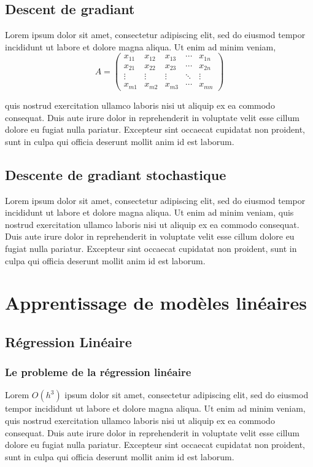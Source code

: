 	
	
	\subsection{Descent de gradiant}
		Lorem ipsum dolor sit amet, consectetur adipiscing elit, sed do eiusmod tempor incididunt ut labore et dolore magna aliqua. Ut enim ad minim veniam, \\ 
		
		$$A = \begin{pmatrix}
		x_{11} & x_{12} & x_{13} & \cdots & x_{1n} \\
		x_{21} & x_{22} & x_{23} & \cdots & x_{2n} \\
		\vdots & \vdots & \vdots & \ddots & \vdots \\
		x_{m1} & x_{m2} & x_{m3} & \cdots & x_{mn} 
		\end{pmatrix}$$
	
	
		quis nostrud exercitation ullamco laboris nisi ut aliquip ex ea commodo consequat. Duis aute irure dolor in reprehenderit in voluptate velit esse cillum dolore eu fugiat nulla pariatur. Excepteur sint occaecat cupidatat non proident, sunt in culpa qui officia deserunt mollit anim id est laborum.
	
	\subsection{Descente de gradiant stochastique}
		Lorem ipsum dolor sit amet, consectetur adipiscing elit, sed do eiusmod tempor incididunt ut labore et dolore magna aliqua. Ut enim ad minim veniam, quis nostrud exercitation ullamco laboris nisi ut aliquip ex ea commodo consequat. Duis aute irure dolor in reprehenderit in voluptate velit esse cillum dolore eu fugiat nulla pariatur. Excepteur sint occaecat cupidatat non proident, sunt in culpa qui officia deserunt mollit anim id est laborum.	
	\section{Apprentissage de modèles linéaires}
	\subsection{Régression Linéaire}
	\subsubsection{Le probleme de la régression linéaire}
		Lorem $O(h^3)$ ipsum dolor sit amet, consectetur adipiscing elit, sed do eiusmod tempor incididunt ut labore et dolore magna aliqua. Ut enim ad minim veniam, quis nostrud exercitation ullamco laboris nisi ut aliquip ex ea commodo consequat. Duis aute irure dolor in reprehenderit in voluptate velit esse cillum dolore eu fugiat nulla pariatur. Excepteur sint occaecat cupidatat non proident, sunt in culpa qui officia deserunt mollit anim id est laborum.
